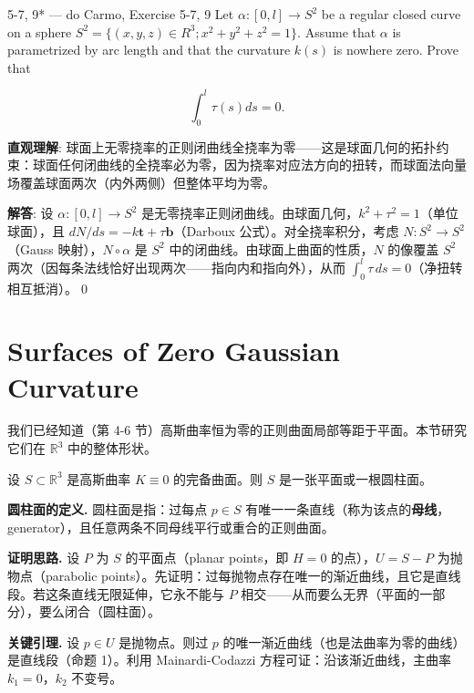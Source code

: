 \begin{exercise}{5-7, 9* — do Carmo, Exercise 5-7, 9}
Let $\alpha \colon [0, l] \to S^2$ be a regular closed curve on a sphere $S^2 = \{(x, y, z) \in R^3; x^2 + y^2 + z^2 = 1\}$. Assume that $\alpha$ is parametrized by arc length and that the curvature $k(s)$ is nowhere zero. Prove that

$$
\int_ {0} ^ {l} \tau (s) d s = 0.
$$
\end{exercise}
\begin{solution}
\textbf{直观理解}: 球面上无零挠率的正则闭曲线全挠率为零——这是球面几何的拓扑约束：球面任何闭曲线的全挠率必为零，因为挠率对应法方向的扭转，而球面法向量场覆盖球面两次（内外两侧）但整体平均为零。

\textbf{解答}: 设 $\alpha: [0,l]\to S^2$ 是无零挠率正则闭曲线。由球面几何，$k^2+\tau^2=1$（单位球面），且 $dN/ds = -k\mathbf{t} + \tau\mathbf{b}$（Darboux 公式）。对全挠率积分，考虑 $N: S^2\to S^2$（Gauss 映射），$N\circ\alpha$ 是 $S^2$ 中的闭曲线。由球面上曲面的性质，$N$ 的像覆盖 $S^2$ 两次（因每条法线恰好出现两次——指向内和指向外），从而 $\int_0^l\tau\,ds = 0$（净扭转相互抵消）。\qed
\end{solution}

\section{Surfaces of Zero Gaussian Curvature}\label{sec:zero-gaussian-curvature}

我们已经知道（第 4-6 节）高斯曲率恒为零的正则曲面局部等距于平面。本节研究它们在 $\mathbb{R}^3$ 中的整体形状。

\begin{Theorem}\label{zero-curvature-surface}
设 $S \subset \mathbb{R}^3$ 是高斯曲率 $K \equiv 0$ 的完备曲面。则 $S$ 是一张平面或一根圆柱面。
\end{Theorem}

\textbf{圆柱面的定义.} 圆柱面是指：过每点 $p \in S$ 有唯一一条直线（称为该点的\textbf{母线}，generator），且任意两条不同母线平行或重合的正则曲面。

\textbf{证明思路.} 设 $P$ 为 $S$ 的平面点（planar points，即 $H=0$ 的点），$U = S - P$ 为抛物点（parabolic points）。先证明：过每抛物点存在唯一的渐近曲线，且它是直线段。若这条直线无限延伸，它永不能与 $P$ 相交——从而要么无界（平面的一部分），要么闭合（圆柱面）。

\textbf{关键引理.} 设 $p \in U$ 是抛物点。则过 $p$ 的唯一渐近曲线（也是法曲率为零的曲线）是直线段（命题 1）。利用 Mainardi-Codazzi 方程可证：沿该渐近曲线，主曲率 $k_1 = 0$，$k_2$ 不变号。

